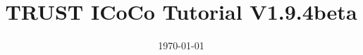\documentclass[10pt, hyperref={unicode=true,pdfusetitle, bookmarks=true,bookmarksnumbered=false,bookmarksopen=false, breaklinks=false,pdfborder={0 0 1},backref=true,colorlinks=true,linkcolor=darkblue,pageanchor, urlcolor=darkblue}]{beamer}
\title[TRUST ICoCo Tutorial V1.9.4beta]{TRUST ICoCo Tutorial V1.9.4beta}
\institute[CEA/DES/ISAS/DM2S] %
{
CEA Saclay \\ %
\medskip
\textit{Support team: trust@cea.fr} %
\medskip
}
\date{\today} %
\begin{document}
\begin{frame}
\titlepage %
\end{frame}

\begin{frame}
\tableofcontents [hideallsubsections]
\end{frame}
\end{document}
